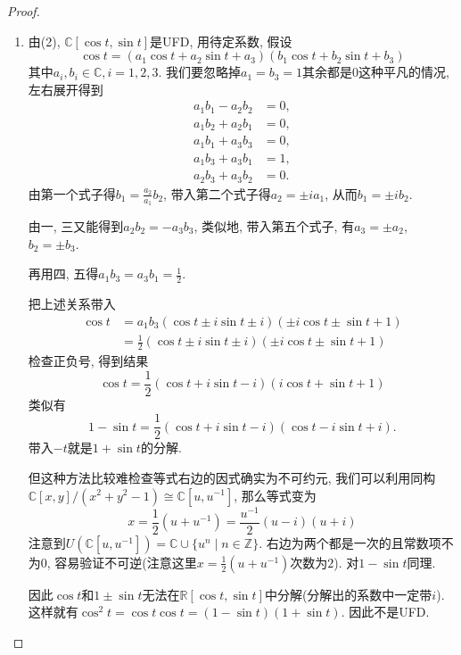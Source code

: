 \begin{proof}
\begin{enumerate}[(1)]
    \item 由(2), $\mathbb{C}[\cos t, \sin t]$是UFD, 用待定系数, 假设
    \[
        \cos t = (a_1\cos t + a_2\sin t + a_3)(b_1\cos t + b_2\sin t + b_3)
    \]
    其中$a_i, b_i \in \mathbb{C}, i = 1, 2, 3$. 我们要忽略掉$a_1 = b_3 = 1$其余都是$0$这种平凡的情况, 左右展开得到
    \[
        \begin{aligned}
            a_1b_1 - a_2b_2 &= 0,\\
            a_1b_2 + a_2b_1 &= 0,\\
            a_1b_1 + a_3b_3 &= 0,\\
            a_1b_3 + a_3b_1 &= 1,\\
            a_2b_3 + a_3b_2 &= 0.
        \end{aligned}
    \]
    由第一个式子得$b_1 = \frac{a_2}{a_1}b_2$, 带入第二个式子得$a_2 = \pm ia_1$, 从而$b_1 = \pm ib_2$.
    
    由一, 三又能得到$a_2b_2 = -a_3b_3$, 类似地, 带入第五个式子, 有$a_3 = \pm a_2$, $b_2 = \pm b_3$.

    再用四, 五得$a_1b_3 = a_3b_1 = \frac{1}{2}$.

    把上述关系带入
    \[
    \begin{aligned}
        \cos t &= a_1b_3(\cos t \pm i\sin t \pm i)(\pm i\cos t \pm \sin t + 1)\\
        &= \frac{1}{2}(\cos t \pm i\sin t \pm i)(\pm i\cos t \pm \sin t + 1)
    \end{aligned}
    \]
    检查正负号, 得到结果
    \[
        \cos t = \frac{1}{2}(\cos t + i\sin t - i)(i\cos t + \sin t + 1)  
    \]
    类似有
    \[
        1 - \sin t = \frac{1}{2}(\cos t + i\sin t - i)(\cos t - i\sin t + i).
    \]
    带入$-t$就是$1 + \sin t$的分解.

    但这种方法比较难检查等式右边的因式确实为不可约元, 我们可以利用同构$\mathbb{C}[x, y]/(x^2 + y^2 - 1) \cong \mathbb{C}[u, u^{-1}]$, 那么等式变为
    \[
        x = \frac{1}{2}(u + u^{-1}) = \frac{u^{-1}}{2}(u - i)(u + i)
    \]
    注意到$U(\mathbb{C}[u, u^{-1}]) = \mathbb{C} \cup \{u^n \mid n \in \mathbb{Z}\}$. 右边为两个都是一次的且常数项不为$0$, 容易验证不可逆(注意这里$x = \frac{1}{2}(u + u^{-1})$次数为$2$). 对$1 - \sin t$同理.
    
    因此$\cos t$和$1 \pm \sin t$无法在$\mathbb{R}[\cos t, \sin t]$中分解(分解出的系数中一定带$i$). 这样就有$\cos^2 t = \cos t\cos t = (1 - \sin t)(1 + \sin t)$. 因此不是UFD.
\end{enumerate}
\end{proof}

